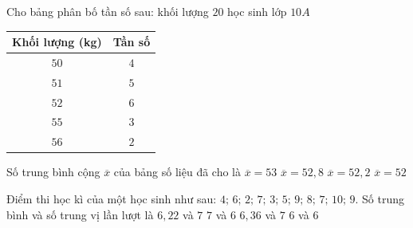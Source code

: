 \begin{ex}%
	Cho bảng phân bố tần số sau: khối lượng $20$ học sinh lớp $10A$\\
	\begin{center}
		\begin{tabular}{|c|c|}
			\hline Khối lượng (kg) & Tần số \\
			\hline $50$ & $4$ \\
			\hline $51$ & $5$ \\
			\hline $52$ & $6$ \\
			\hline $55$ & $3$ \\
			\hline $56$ & $2$ \\
			\hline
		\end{tabular}
	\end{center}
	Số trung bình cộng $\overline x $ của bảng số liệu đã cho là
	\choice
	{$\overline x=53$}
	{$\overline x=52{,}8$}
	{\True $\overline x=52{,}2$}
	{$\overline x=52$}
\end{ex}

\begin{ex}%
	Điểm thi học kì của một học sinh như sau: $4;\,6;\,2;\,7;\,3;\,5;\,9;\,8;\,7;\,10;\,9$. Số trung bình và số trung vị lần lượt là
	\choice
	{$6{,}22$ và $7$}
	{$7$ và $6$}
	{\True $6{,}36$ và $7$}
	{$6$ và $6$}
\end{ex}

